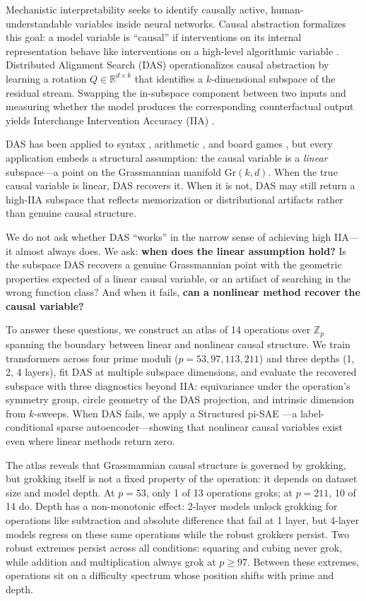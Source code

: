 \documentclass{article}
\newcommand{\Gr}{\mathrm{Gr}}
\newcommand{\R}{\mathbb{R}}
\newcommand{\Z}{\mathbb{Z}}
\begin{document}
Mechanistic interpretability seeks to identify causally active,
human-understandable variables inside neural networks. Causal abstraction
formalizes this goal: a model variable is ``causal'' if interventions on its
internal representation behave like interventions on a high-level algorithmic
variable \citep{geiger2021causal}. Distributed Alignment Search (DAS)
operationalizes causal abstraction by learning a rotation $Q \in \R^{d \times k}$
that identifies a $k$-dimensional subspace of the residual stream. Swapping the
in-subspace component between two inputs and measuring whether the model
produces the corresponding counterfactual output yields Interchange Intervention
Accuracy (IIA) \citep{geiger2023finding}.

DAS has been applied to syntax \citep{geiger2023finding}, arithmetic
\citep{wu2024interpretability}, and board games \citep{li2023emergent}, but
every application embeds a structural assumption: the causal variable is a
\emph{linear} subspace---a point on the Grassmannian manifold $\Gr(k,d)$. When
the true causal variable is linear, DAS recovers it. When it is not, DAS may
still return a high-IIA subspace that reflects memorization or distributional
artifacts rather than genuine causal structure.

We do not ask whether DAS ``works'' in the narrow sense of achieving high IIA---it
almost always does. We ask: \textbf{when does the linear assumption hold?} Is the
subspace DAS recovers a genuine Grassmannian point with the geometric properties
expected of a linear causal variable, or an artifact of searching in the wrong
function class? And when it fails, \textbf{can a nonlinear method recover the
causal variable?}

To answer these questions, we construct an atlas of 14 operations over $\Z_p$
spanning the boundary between linear and nonlinear causal structure. We train
transformers across four prime moduli ($p = 53, 97, 113, 211$) and three
depths (1, 2, 4 layers), fit DAS at multiple subspace dimensions, and
evaluate the recovered subspace with three diagnostics beyond IIA:
equivariance under the operation's symmetry group, circle geometry of the DAS
projection, and intrinsic dimension from $k$-sweeps. When DAS fails, we apply
a Structured pi-SAE \citep{narayanaswamy2017learning}---a label-conditional
sparse autoencoder---showing that nonlinear causal variables exist even where
linear methods return zero.

The atlas reveals that Grassmannian causal structure is governed by grokking,
but grokking itself is not a fixed property of the operation: it depends on
dataset size and model depth. At $p{=}53$, only 1 of 13 operations groks; at
$p{=}211$, 10 of 14 do. Depth has a non-monotonic effect: 2-layer models
unlock grokking for operations like subtraction and absolute difference that
fail at 1 layer, but 4-layer models regress on these same operations while
the robust grokkers persist. Two robust
extremes persist across all conditions: squaring and cubing never grok, while
addition and multiplication always grok at $p \geq 97$. Between these
extremes, operations sit on a difficulty spectrum whose position shifts with
prime and depth.
\end{document}
